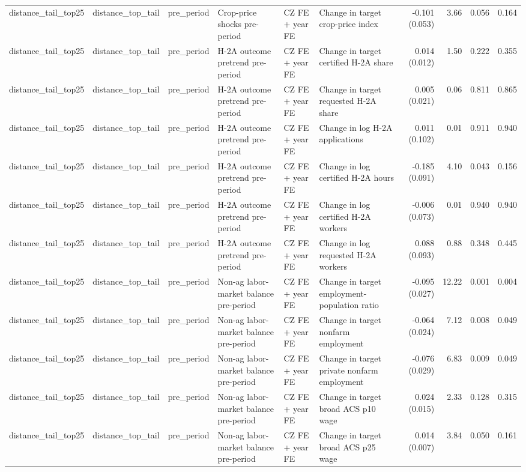 \begin{tabular}{llllllrrrr}
distance_tail_top25 & distance_top_tail & pre_period & Crop-price shocks pre-period & CZ FE + year FE & Change in target crop-price index & -0.101 (0.053) & 3.66 & 0.056 & 0.164 \\
distance_tail_top25 & distance_top_tail & pre_period & H-2A outcome pretrend pre-period & CZ FE + year FE & Change in target certified H-2A share & 0.014 (0.012) & 1.50 & 0.222 & 0.355 \\
distance_tail_top25 & distance_top_tail & pre_period & H-2A outcome pretrend pre-period & CZ FE + year FE & Change in target requested H-2A share & 0.005 (0.021) & 0.06 & 0.811 & 0.865 \\
distance_tail_top25 & distance_top_tail & pre_period & H-2A outcome pretrend pre-period & CZ FE + year FE & Change in log H-2A applications & 0.011 (0.102) & 0.01 & 0.911 & 0.940 \\
distance_tail_top25 & distance_top_tail & pre_period & H-2A outcome pretrend pre-period & CZ FE + year FE & Change in log certified H-2A hours & -0.185 (0.091) & 4.10 & 0.043 & 0.156 \\
distance_tail_top25 & distance_top_tail & pre_period & H-2A outcome pretrend pre-period & CZ FE + year FE & Change in log certified H-2A workers & -0.006 (0.073) & 0.01 & 0.940 & 0.940 \\
distance_tail_top25 & distance_top_tail & pre_period & H-2A outcome pretrend pre-period & CZ FE + year FE & Change in log requested H-2A workers & 0.088 (0.093) & 0.88 & 0.348 & 0.445 \\
distance_tail_top25 & distance_top_tail & pre_period & Non-ag labor-market balance pre-period & CZ FE + year FE & Change in target employment-population ratio & -0.095 (0.027) & 12.22 & 0.001 & 0.004 \\
distance_tail_top25 & distance_top_tail & pre_period & Non-ag labor-market balance pre-period & CZ FE + year FE & Change in target nonfarm employment & -0.064 (0.024) & 7.12 & 0.008 & 0.049 \\
distance_tail_top25 & distance_top_tail & pre_period & Non-ag labor-market balance pre-period & CZ FE + year FE & Change in target private nonfarm employment & -0.076 (0.029) & 6.83 & 0.009 & 0.049 \\
distance_tail_top25 & distance_top_tail & pre_period & Non-ag labor-market balance pre-period & CZ FE + year FE & Change in target broad ACS p10 wage & 0.024 (0.015) & 2.33 & 0.128 & 0.315 \\
distance_tail_top25 & distance_top_tail & pre_period & Non-ag labor-market balance pre-period & CZ FE + year FE & Change in target broad ACS p25 wage & 0.014 (0.007) & 3.84 & 0.050 & 0.161 \\

\end{tabular}
